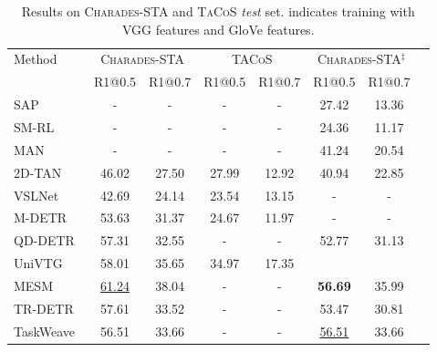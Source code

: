 \begin{table}[ht]

\centering

\caption{Results on \textsc{Charades-STA} and \textsc{TaCoS} \textit{test} set. {\ddag} indicates training with VGG features and GloVe features.}

\setlength{\tabcolsep}{0.05pt}

\begin{small}

\resizebox{1\linewidth}{!}
{

    \begin{tabular}{
        l c   c c   c c   c c
    }
    \toprule
    \multirow{2}{*}{Method} & \multicolumn{2}{c}{\textsc{Charades-STA}} & \multicolumn{2}{c}{\textsc{TACoS}} & \multicolumn{2}{c}{\textsc{Charades-STA}$^{\ddag}$}\\
    \cmidrule(l){2-3}  \cmidrule(l){4-5}  \cmidrule(l){6-7}
    & R1@0.5 & R1@0.7 & R1@0.5 & R1@0.7 & R1@0.5 & R1@0.7\\

    \midrule
SAP~\cite{gao2021fast_SAP}          & -              & -              & -          & -          & 27.42          & 13.36 \\
SM-RL~\cite{wang2019language_sm_rl}        & -              & -              & -          & -          & 24.36          & 11.17 \\
MAN~\cite{Zhang_2019_CVPR_man}          & -              & -              & -          & -          & 41.24          & 20.54 \\
2D-TAN~\cite{zhang2020learning_2d_tan}       & 46.02          & 27.50          & 27.99      & 12.92      & 40.94          & 22.85 \\
VSLNet~\cite{zhang2020span_vslnet}       & 42.69          & 24.14          & 23.54      & 13.15      & -              & - \\
M-DETR~\cite{lei2021detecting_Moment-DETR}       & 53.63          & 31.37          & 24.67      & 11.97      & -              & - \\
QD-DETR~\cite{moon2023query_QD-DETR}      & 57.31          & 32.55          & -          & -          & 52.77          & 31.13 \\
UniVTG~\cite{lin2023univtg_Univtg}       & 58.01          & 35.65          & 34.97      & 17.35      &                &  \\
MESM~\cite{liu2024towards_MESM}         & \underline{61.24} & {38.04}          & -          & -          & \textbf{56.69}          & {35.99} \\
TR-DETR~\cite{sun2024tr_TR-DETR}      & 57.61          & 33.52          & -          & -          & 53.47          & 30.81 \\
TaskWeave~\cite{zhang2024temporally_TaskWeave}    & {56.51}          & 33.66          & -          & -          & \underline{56.51}          & 33.66 \\


\end{tabular}}
\end{small}
\end{table}

